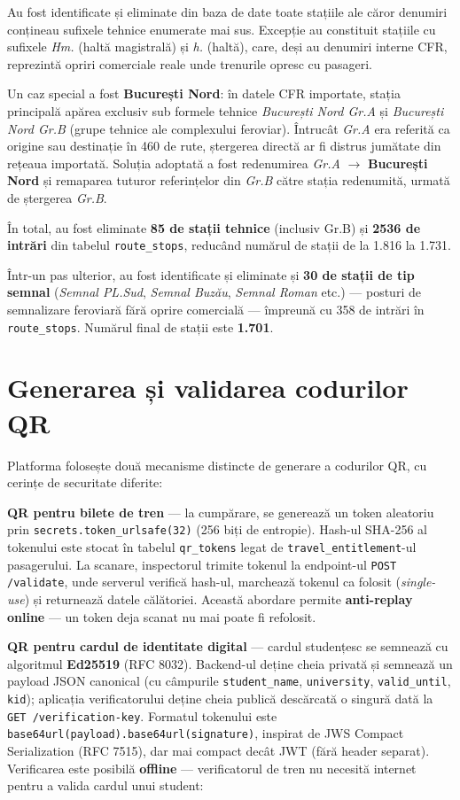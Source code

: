 \documentclass[12pt,a4paper]{report}
\begin{document}
Au fost identificate și eliminate din baza de date toate stațiile ale căror denumiri conțineau sufixele tehnice enumerate mai sus. Excepție au constituit stațiile cu sufixele \emph{Hm.} (haltă magistrală) și \emph{h.} (haltă), care, deși au denumiri interne CFR, reprezintă opriri comerciale reale unde trenurile opresc cu pasageri.

Un caz special a fost \textbf{București Nord}: în datele CFR importate, stația principală apărea exclusiv sub formele tehnice \emph{București Nord Gr.A} și \emph{București Nord Gr.B} (grupe tehnice ale complexului feroviar). Întrucât \emph{Gr.A} era referită ca origine sau destinație în 460 de rute, ștergerea directă ar fi distrus jumătate din rețeaua importată. Soluția adoptată a fost redenumirea \emph{Gr.A} $\rightarrow$ \textbf{București Nord} și remaparea tuturor referințelor din \emph{Gr.B} către stația redenumită, urmată de ștergerea \emph{Gr.B}.

În total, au fost eliminate \textbf{85 de stații tehnice} (inclusiv Gr.B) și \textbf{2536 de intrări} din tabelul \texttt{route\_stops}, reducând numărul de stații de la 1.816 la 1.731.

Într-un pas ulterior, au fost identificate și eliminate și \textbf{30 de stații de tip semnal} (\emph{Semnal PL.Sud}, \emph{Semnal Buzău}, \emph{Semnal Roman} etc.) — posturi de semnalizare feroviară fără oprire comercială — împreună cu 358 de intrări în \texttt{route\_stops}. Numărul final de stații este \textbf{1.701}.

\section{Generarea și validarea codurilor QR}

Platforma folosește două mecanisme distincte de generare a codurilor QR, cu cerințe de securitate diferite:

\textbf{QR pentru bilete de tren} — la cumpărare, se generează un token aleatoriu prin \texttt{secrets.token\_urlsafe(32)} (256 biți de entropie). Hash-ul SHA-256 al tokenului este stocat în tabelul \texttt{qr\_tokens} legat de \texttt{travel\_entitlement}-ul pasagerului. La scanare, inspectorul trimite tokenul la endpoint-ul \texttt{POST /validate}, unde serverul verifică hash-ul, marchează tokenul ca folosit (\emph{single-use}) și returnează datele călătoriei. Această abordare permite \textbf{anti-replay online} — un token deja scanat nu mai poate fi refolosit.

\textbf{QR pentru cardul de identitate digital} — cardul studențesc se semnează cu algoritmul \textbf{Ed25519} (RFC 8032). Backend-ul deține cheia privată și semnează un payload JSON canonical (cu câmpurile \texttt{student\_name}, \texttt{university}, \texttt{valid\_until}, \texttt{kid}); aplicația verificatorului deține cheia publică descărcată o singură dată la \texttt{GET /verification-key}. Formatul tokenului este \texttt{base64url(payload).base64url(signature)}, inspirat de JWS Compact Serialization (RFC 7515), dar mai compact decât JWT (fără header separat). Verificarea este posibilă \textbf{offline} — verificatorul de tren nu necesită internet pentru a valida cardul unui student:
\end{document}
